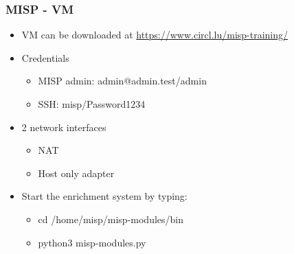 

\begin{frame}[t,plain]
\titlepage
\end{frame}

\begin{frame}
    \frametitle{MISP - VM}
    \begin{itemize}
    \item VM can be downloaded at \url{https://www.circl.lu/misp-training/}
    \item Credentials
        \begin{itemize}
            \item MISP admin: admin@admin.test/admin
            \item SSH: misp/Password1234

        \end{itemize}
    \item 2 network interfaces
        \begin{itemize}
            \item NAT
            \item Host only adapter
        \end{itemize}
    \item Start the enrichment system by typing:
        \begin{itemize}
            \item cd /home/misp/misp-modules/bin
            \item python3 misp-modules.py
        \end{itemize}
   \end{itemize}
\end{frame}

